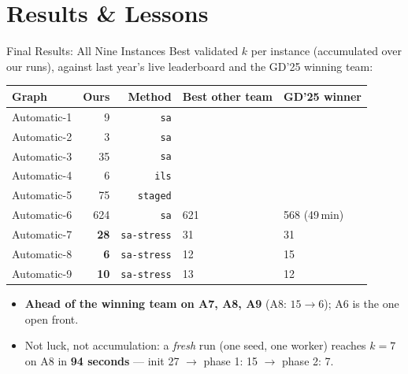 \section{Results \& Lessons}

\begin{frame}{Final Results: All Nine Instances}
  Best validated $k$ per instance (accumulated over our runs), against last year's
  live leaderboard and the GD'25 winning team:
  \begin{center}
    \footnotesize
    \begin{tabular}{lrrll}
      \toprule
      \textbf{Graph} & \textbf{Ours} & \textbf{Method} & \textbf{Best other team} & \textbf{GD'25 winner} \\
      \midrule
      Automatic-1 & 9   & \texttt{sa}        &      &      \\
      Automatic-2 & 3   & \texttt{sa}        &      &      \\
      Automatic-3 & 35  & \texttt{sa}        &      &      \\
      Automatic-4 & 6   & \texttt{ils}       &      &      \\
      Automatic-5 & 75  & \texttt{staged}    &      &      \\
      Automatic-6 & 624 & \texttt{sa}        & 621  & 568 (49\,min) \\
      Automatic-7 & \textbf{28}  & \texttt{sa-stress} & 31   & 31   \\
      Automatic-8 & \textbf{6}   & \texttt{sa-stress} & 12   & 15   \\
      Automatic-9 & \textbf{10}  & \texttt{sa-stress} & 13   & 12   \\
      \bottomrule
    \end{tabular}
  \end{center}
  \smallskip
  \begin{itemize}
    \item \textbf{Ahead of the winning team on A7, A8, A9} (A8: $15 \to 6$);
          A6 is the one open front.
    \item Not luck, not accumulation: a \emph{fresh} run (one seed, one worker)
          reaches $k=7$ on A8 in \textbf{94 seconds} --- init 27
          $\to$ phase 1: 15 $\to$ phase 2: 7.
  \end{itemize}
\end{frame}

